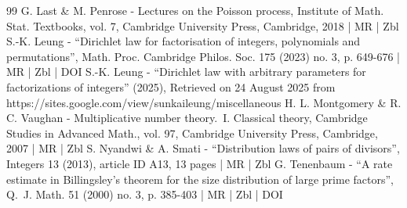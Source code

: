 \begin{thebibliography}{99}
G. Last \& M. Penrose - Lectures on the Poisson process, Institute of Math. Stat. Textbooks, vol. 7, Cambridge University Press, Cambridge, 2018 | MR | Zbl
S.-K. Leung - “Dirichlet law for factorisation of integers, polynomials and permutations”, Math. Proc. Cambridge Philos. Soc. 175 (2023) no. 3, p. 649-676 | MR | Zbl | DOI
S.-K. Leung - “Dirichlet law with arbitrary parameters for factorizations of integers” (2025), Retrieved on 24 August 2025 from https://sites.google.com/view/sunkaileung/miscellaneous
H. L. Montgomery \& R. C. Vaughan - Multiplicative number theory. I. Classical theory, Cambridge Studies in Advanced Math., vol. 97, Cambridge University Press, Cambridge, 2007 | MR | Zbl
S. Nyandwi \& A. Smati - “Distribution laws of pairs of divisors”, Integers 13 (2013), article ID A13, 13 pages | MR | Zbl
G. Tenenbaum - “A rate estimate in Billingsley’s theorem for the size distribution of large prime factors”, Q. J. Math. 51 (2000) no. 3, p. 385-403 | MR | Zbl | DOI
\end{thebibliography}
